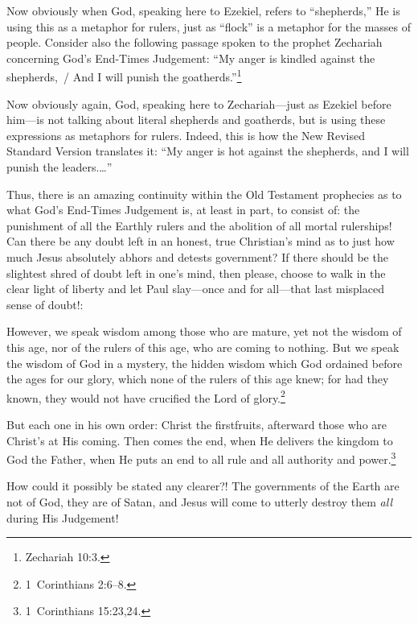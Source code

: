 \documentclass[letterpaper,12pt]{article}
\newenvironment{squote}
  {\small\quote}
  {\endquote\normalsize}
\begin{document}
Now obviously when God, speaking here to Ezekiel, refers to ``shepherds,'' He is using this as a metaphor for rulers, just as ``flock'' is a metaphor for the masses of people. Consider also the following passage spoken to the prophet Zechariah concerning God's End-Times Judgement: ``My anger is kindled against the shepherds,~/ And I will punish the goatherds.''\footnote{Zechariah 10:3.}

Now obviously again, God, speaking here to Zechariah---just as Ezekiel before him---is not talking about literal shepherds and goatherds, but is using these expressions as metaphors for rulers. Indeed, this is how the New Revised Standard Version translates it: ``My anger is hot against the shepherds, and I will punish the leaders\mbox{.\hspace{0.167em}\ldots''}

Thus, there is an amazing continuity within the Old Testament prophecies as to what God's End-Times Judgement is, at least in part, to consist of: the punishment of all the Earthly rulers and the abolition of all mortal rulerships! Can there be any doubt left in an honest, true Christian's mind as to just how much Jesus absolutely abhors and detests government? If there should be the slightest shred of doubt left in one's mind, then please, choose to walk in the clear light of liberty and let Paul slay---once and for all---that last misplaced sense of doubt!:

\begin{squote}
However, we speak wisdom among those who are mature, yet not the wisdom of this age, nor of the rulers of this age, who are coming to nothing. But we speak the wisdom of God in a mystery, the hidden wisdom which God ordained before the ages for our glory, which none of the rulers of this age knew; for had they known, they would not have crucified the Lord of glory.\footnote{1~Corinthians 2:6--8.}
\end{squote}

\begin{squote}
But each one in his own order: Christ the firstfruits, afterward those who are Christ's at His coming. Then comes the end, when He delivers the kingdom to God the Father, when He puts an end to all rule and all authority and power.\footnote{1~Corinthians 15:23,24.}
\end{squote}

How could it possibly be stated any clearer?! The governments of the Earth are not of God, they are of Satan, and Jesus will come to utterly destroy them \emph{all} during His Judgement!
\end{document}
